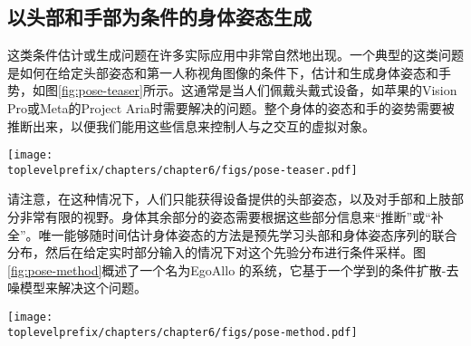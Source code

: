 \documentclass[../../book-main_zh.tex]{subfiles}
\begin{document}
\subsection{以头部和手部为条件的身体姿态生成}\label{sub:ego-allo}
这类条件估计或生成问题在许多实际应用中非常自然地出现。一个典型的这类问题是如何在给定头部姿态和第一人称视角图像的条件下，估计和生成身体姿态和手势，如图\ref{fig:pose-teaser}所示。这通常是当人们佩戴头戴式设备，如苹果的Vision Pro或Meta的Project Aria时需要解决的问题。整个身体的姿态和手的姿势需要被推断出来，以便我们能用这些信息来控制人与之交互的虚拟对象。
\begin{figure*}[t]
  \centering
  \texttt{[image: \\toplevelprefix/chapters/chapter6/figs/pose-teaser.pdf]}
    \caption{
一个根据第一人称视角的SLAM姿态和图像（左图）来估计人体身高、姿态和手部参数（中图）的系统。输出捕捉了佩戴者在场景的异我参照系中的动作，我们在这里通过3D重建进行可视化（右图）。
  }
  \label{fig:pose-teaser}

\end{figure*}

请注意，在这种情况下，人们只能获得设备提供的头部姿态，以及对手部和上肢部分非常有限的视野。身体其余部分的姿态需要根据这些部分信息来“推断”或“补全”。唯一能够随时间估计身体姿态的方法是预先学习头部和身体姿态序列的联合分布，然后在给定实时部分输入的情况下对这个先验分布进行条件采样。图\ref{fig:pose-method}概述了一个名为EgoAllo \cite{yi2024egoallo}的系统，它基于一个学到的条件扩散-去噪模型来解决这个问题。
\begin{figure*}[t]
  \centering
  \texttt{[image: \\toplevelprefix/chapters/chapter6/figs/pose-method.pdf]}
\caption{
    \textbf{EgoAllo \cite{yi2024egoallo}技术组件概述。}
    一个扩散模型被预训练，能够根据局部身体参数生成身体姿态序列（中图）。
    SLAM姿态的一个不变参数化$g(\cdot)$（左图）被用来对扩散模型进行条件化。这些参数可以通过全局对齐到输入姿态，从而被放置到全局坐标系中。
    当第一人称视角视频可用时，它被用于通过HaMeR~\cite{pavlakos2023reconstructing}进行手部检测（左图），这可以通过生成的手势进行引导，并融入到样本中。
  }
  \label{fig:pose-method}
\end{figure*}
\end{document}
